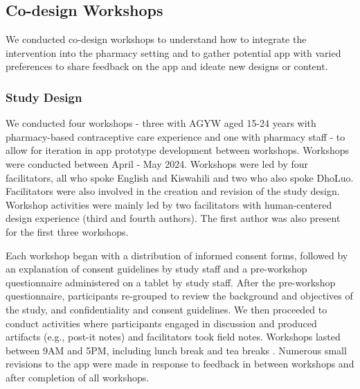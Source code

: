 \subsection{Co-design Workshops}
We conducted co-design workshops to understand how to integrate the intervention into the pharmacy setting and to gather potential app  with varied preferences to share feedback on the app and ideate new designs or content. 

\subsubsection{Study Design}

We conducted four workshops - three with AGYW aged 15-24 years with pharmacy-based contraceptive care experience and one with pharmacy staff - to allow for iteration in app prototype development between workshops. Workshops were conducted between April - May 2024. Workshops were led by four facilitators, all who spoke English and Kiswahili and two who also spoke DhoLuo. Facilitators were also involved in the creation and revision of the study design. Workshop activities were mainly led by two facilitators with human-centered design experience (third and fourth authors). The first author was also present for the first three workshops. 

Each workshop began with a distribution of informed consent forms, followed by an explanation of consent guidelines by study staff and a pre-workshop questionnaire administered on a tablet by study staff. After the pre-workshop questionnaire, participants re-grouped to review the background and objectives of the study, and confidentiality and consent guidelines. We then proceeded to conduct activities where participants engaged in discussion and produced artifacts (e.g., post-it notes) and facilitators took field notes. Workshops lasted between 9AM and 5PM, including  lunch break and  tea breaks . Numerous small revisions to the app were made in response to feedback in between workshops and after completion of all workshops. 

